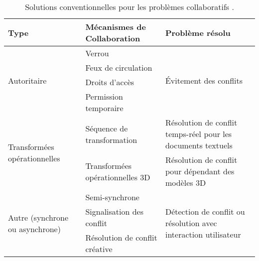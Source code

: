 \begin{table}
	\centering
	\noindent
	\caption{Solutions conventionnelles pour les problèmes collaboratifs 
	\cite{Yu2016}.}
	
	\small
	\label{table:collprobs}
	\begin{tabular}{ m{}  m{} m{}}\hline
		\textbf{Type}& \textbf{Mécanismes de Collaboration} & \textbf{Problème 
		résolu}    \\ \hline
		\multirow{4}{*}{Autoritaire}                     & Verrou                        & 
		\multirow{4}{*}{Évitement des conflits}                                          \\
		& Feux de circulation  
		&                                                                                  \\
		& Droits d'accès               
		&                                                                                  \\
		& Permission temporaire        
		&                                                                                  \\ \hline
		\multirow{2}{0.2\textwidth}{Transformées opérationnelles}                     & 
		Séquence de transformation                     & Résolution de conflit temps-réel 
		pour les documents textuels                     \\ \cline{2-3} 
		& Transformées opérationnelles 3D                 & Résolution de conflit pour 
		dépendant des modèles 3D                              \\ \hline
		\multirow{3}{0.2\textwidth}{Autre (synchrone ou asynchrone)} & 
		Semi-synchrone                               & \multirow{3}{0.3\textwidth}{Détection 
		de conflit ou résolution avec interaction utilisateur} \\
		& Signalisation des conflit %
		&                                                                                  \\
		& Résolution de conflit créative                 &                      \\ 
		\bottomrule                                                           
	\end{tabular}
\end{table}


